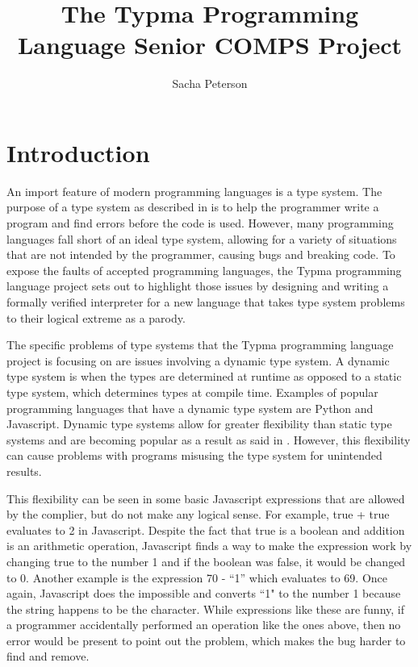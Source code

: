 \documentclass[10pt,twocolumn]{article}
\title{The Typma Programming Language Senior COMPS Project}
\author{Sacha Peterson}
\affiliation{Occidental College}
\begin{document}
\maketitle

\section{Introduction}

An import feature of modern programming languages is a type system. The purpose of a type system as described in \textcite{Pierce2002Types} is to help the programmer write a program and find errors before the code is used. However, many programming languages fall short of an ideal type system, allowing for a variety of situations that are not intended by the programmer, causing bugs and breaking code. To expose the faults of accepted programming languages, the Typma programming language project sets out to highlight those issues by designing and writing a formally verified interpreter for a new language that takes type system problems to their logical extreme as a parody.

The specific problems of type systems that the Typma programming language project is focusing on are issues involving a dynamic type system. A dynamic type system is when the types are determined at runtime as opposed to a static type system, which determines types at compile time. Examples of popular programming languages that have a dynamic type system are Python and Javascript. Dynamic type systems allow for greater flexibility than static type systems and are becoming popular as a result as said in \textcite{Pradel2014TypeDevil}. However, this flexibility can cause problems with programs misusing the type system for unintended results.

This flexibility can be seen in some basic Javascript expressions that are allowed by the complier, but do not make any logical sense. For example, true + true evaluates to 2 in Javascript. Despite the fact that true is a boolean and addition is an arithmetic operation, Javascript finds a way to make the expression work by changing true to the number 1 and if the boolean was false, it would be changed to 0. Another example is the expression 70 - “1” which evaluates to 69. Once again, Javascript does the impossible and converts ``1" to the number 1 because the string happens to be the character. While expressions like these are funny, if a programmer accidentally performed an operation like the ones above, then no error would be present to point out the problem, which makes the bug harder to find and remove.
\end{document}
